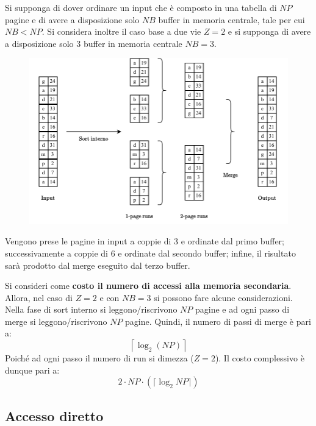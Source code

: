 \documentclass[a4paper]{article}
\begin{document}
	Si supponga di dover ordinare un input che è composto in una tabella di $NP$ pagine e di avere a disposizione solo $NB$ buffer in memoria centrale, tale per cui $NB < NP$. Si considera inoltre il caso base a due vie $Z=2$ e si supponga di avere a disposizione solo $3$ buffer in memoria centrale $NB = 3$.
	\begin{figure}[!htp]
		\centering
		\includegraphics[width=\textwidth]{img/z-way_sort-merge.pdf}
	\end{figure}
	
	\noindent
	Vengono prese le pagine in input a coppie di $3$ e ordinate dal primo buffer; successivamente a coppie di $6$ e ordinate dal secondo buffer; infine, il risultato sarà prodotto dal merge eseguito dal terzo buffer.\newline
	
	\noindent
	Si consideri come \textbf{costo il numero di accessi alla memoria secondaria}. Allora, nel caso di $Z = 2$ e con $NB = 3$ si possono fare alcune considerazioni. Nella fase di sort interno si leggono/riscrivono $NP$ pagine e ad ogni passo di merge si leggono/riscrivono $NP$ pagine. Quindi, il numero di passi di merge è pari a:
	\begin{equation*}
		\left\lceil \log_{2}\left(NP\right) \right\rceil
	\end{equation*}
	Poiché ad ogni passo il numero di run si dimezza ($Z = 2$). Il costo complessivo è dunque pari a:
	\begin{equation*}
		2 \cdot NP \cdot \left(\lceil \log_{2} NP \rceil\right)
	\end{equation*}\newpage

	\subsection{Accesso diretto}
	
\end{document}
